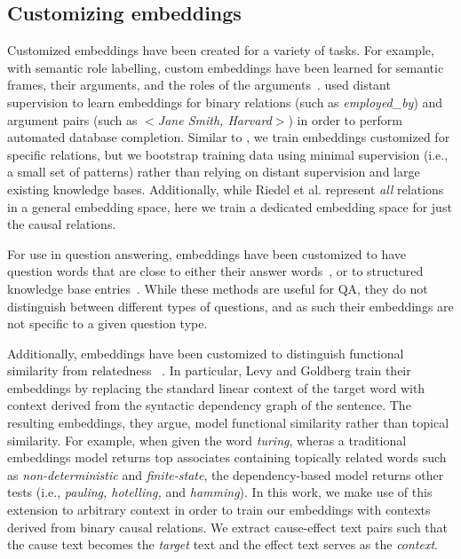 \subsection{Customizing embeddings}
Customized embeddings have been created for a variety of tasks. %
For example, with semantic role labelling, custom embeddings have been learned for semantic frames, their arguments, and the roles of the arguments~\citep[e.g.,][]{fitzgerald2015semantic,woodsenddistributed}.  \citet{riedel2013relation} used distant supervision to learn embeddings for binary relations (such as \textit{employed\_by}) and argument pairs (such as $<$\textit{Jane Smith, Harvard}$>$) in order to perform automated database completion.  
Similar to \citeauthor{riedel2013relation}, we train embeddings customized for specific relations, but we bootstrap training data using minimal supervision (i.e., a small set of patterns) rather than relying on distant supervision and large existing knowledge bases.  Additionally, while Riedel et al. represent \textit{all} relations in a general embedding space, here we train a dedicated embedding space for just the causal relations. 

For use in question answering, embeddings have been customized to have question words that are close to either their answer words~\citep{bordes2014question}, or to structured knowledge base entries~\citep{yang2014joint}.  While these methods are useful for QA, they do not distinguish between different types of questions, and as such their embeddings are not specific to a given question type.

Additionally, embeddings have been customized to distinguish functional similarity from relatedness ~\citep{levy2014dependency,kielaspecializing}.
In particular, Levy and Goldberg train their embeddings by replacing the standard linear context of the target word with context derived from the syntactic dependency graph of the sentence.  The resulting embeddings, they argue, model functional similarity rather than topical similarity.  For example, when given the word \emph{turing}, wheras a traditional embeddings model returns top associates containing topically related words such as \emph{non-deterministic} and \emph{finite-state}, the dependency-based model returns other tests (i.e., \emph{pauling, hotelling,} and \emph{hamming}).
In this work, we make use of this extension to arbitrary context in order to train our embeddings with contexts derived from binary causal relations.  We extract cause-effect text pairs such that the cause text becomes the \emph{target} text and the effect text serves as the \emph{context}. 

